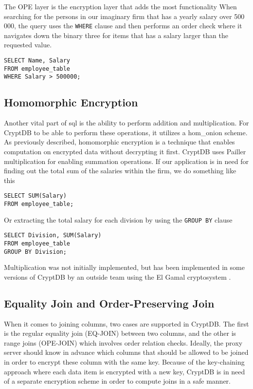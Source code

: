 The OPE layer is the encryption layer that adds the most functionality
When searching for the persons in our imaginary firm that has a yearly salary over 500 000, the query uses the \verb!WHERE! clause and then performs an order check where it navigates down the binary three for items that has a salary larger than the requested value.

\begin{verbatim}
SELECT Name, Salary
FROM employee_table
WHERE Salary > 500000;
\end{verbatim}


\subsection{Homomorphic Encryption}
Another vital part of \Gls{sql} is the ability to perform addition and multiplication. For CryptDB to be able to perform these operations, it utilizes a \Gls{hom_onion} scheme. As previously described, homomorphic encryption is a technique that enables computation on encrypted data without decrypting it first. CryptDB uses Pailler multiplication \cite{Paillier} for enabling summation operations. If our application is in need for finding out the total sum of the salaries within the firm, we do something like this

\begin{verbatim}
SELECT SUM(Salary)
FROM employee_table;
\end{verbatim}

\noindent
Or extracting the total salary for each division by using the \verb!GROUP BY! clause


\begin{verbatim}
SELECT Division, SUM(Salary)
FROM employee_table
GROUP BY Division;
\end{verbatim}
Multiplication was not initially implemented, but has been implemented in some versions of CryptDB by an outside team using the El Gamal cryptosystem \cite{cryptdb_guidelines}. 


\subsection{Equality Join and Order-Preserving Join}
When it comes to joining columns, two cases are supported in CryptDB. The first is the regular equality join (EQ-JOIN) between two columns, and the other is range joins (OPE-JOIN) which involves order relation checks. Ideally, the proxy server should know in advance which columns that should be allowed to be joined in order to encrypt these column with the same key. Because of the key-chaining approach where each data item is encrypted with a new key, CryptDB is in need of a separate encryption scheme in order to compute joins in a safe manner.


